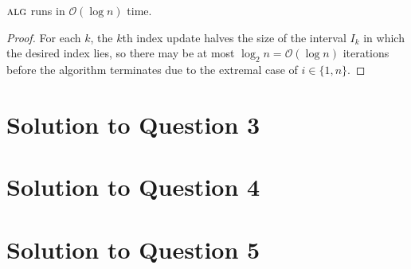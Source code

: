 \documentclass[11pt]{article}
\renewcommand{\O}{\mathcal{O}}
\newcommand{\alg}{\textsc{alg}}
\begin{document}
 $\alg$ runs in $\O(\log n)$ time.

\begin{proof}
  For each $k$, the $k$th index update halves the size of the interval $I_k$ in which the desired index lies, so there may be at most $\log_{2}n = \O(\log n)$ iterations before the algorithm terminates due to the extremal case of $i \in \{1, n\}$.
\end{proof}
\section{Solution to Question 3}



\section{Solution to Question 4}



\section{Solution to Question 5}
\end{document}
